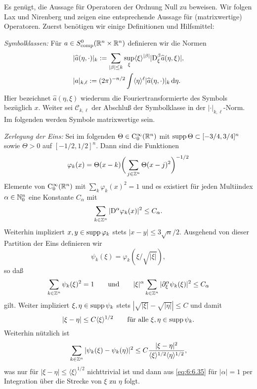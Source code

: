 Es genügt, die Aussage für Operatoren der Ordnung Null zu beweisen. Wir folgen Lax und Nirenberg \cite{Lax:1966} und zeigen eine entsprechende Aussage für (matrixwertige) Operatoren. Zuerst benötigen wir einige Definitionen und Hilfsmittel:

\medskip\noindent
{\em Symbolklassen:} Für $ a\in S^0_{\rm comp}(\mathbb R^n\times\mathbb R^n)$ definieren wir die Normen
\begin{equation}
\begin{split}&	\vert \widehat{a}(\eta,\cdot)\vert_k := \sum\limits_{\vert \beta\vert \le k} \sup\limits_{\xi} \langle \xi\rangle^{\vert \beta\vert}\vert\mathrm D_\xi^\beta  \widehat{a}(\eta,\xi)\vert,\\
&   | a|_{k,\ell} := (2\pi)^{-n/2} \int \langle\eta\rangle^\ell   \vert \widehat{a}(\eta,\cdot)\vert_k \,\mathrm d \eta.
\end{split}
\end{equation}
Hier bezeichnet $\widehat a(\eta,\xi)$ wiederum die Fouriertransformierte des Symbols bezüglich $x$. Weiter sei $\mathcal{C}_{k,\ell}$ der Abschluß der Symbolklasse in der $ |\cdot |_{k,\ell}$-Norm.
Im folgenden werden Symbole matrixwertige sein.

\medskip\noindent
{\em Zerlegung der Eins:} Sei im folgenden $\Theta\in\mathrm C_0^\infty(\mathbb R^n)$ mit $\operatorname{supp}\Theta\subset [-3/4,3/4]^n$ sowie $\Theta>0$ auf $[-1/2,1/2]^n$. Dann sind die Funktionen
\begin{equation}
\varphi_k(x) = \Theta(x-k) \bigg(\sum_{j\in\mathbb Z^n} \Theta(x-j)^2\bigg)^{-1/2}
\end{equation}
Elemente von $\mathrm C_0^\infty(\mathbb R^n)$ mit $\sum_{k} \varphi_k(x)^2=1$ und es existiert für jeden Multiindex $\alpha\in\mathbb N_0^n$ eine Konstante $C_\alpha$ mit
\begin{equation}
    \sum_{k\in\mathbb Z^n} | \mathrm D^\alpha \varphi_k(x)|^2 \le C_\alpha.
\end{equation}
Weiterhin impliziert $x,y\in\operatorname{supp}\varphi_k$ stets $|x-y|\le 3\sqrt n/2$. Ausgehend von dieser Partition der Eins definieren wir
\begin{equation}
    \psi_k(\xi)= \varphi_k(\xi / \sqrt{|\xi|}), 
\end{equation}
so daß
\begin{equation}\label{eq:6:6.35} 
    \sum_{k\in\mathbb Z^n} \psi_k(\xi)^2 = 1\qquad\text{und}\qquad |\xi|^\alpha \sum_{k\in\mathbb Z^n} |\partial_\xi^\alpha \psi_k(\xi)|^2 \le C_\alpha
\end{equation}
gilt. Weiter impliziert $\xi,\eta\in\operatorname{supp}\psi_k$ stets $|\sqrt{|\xi|}-\sqrt{|\eta|}|\le C$ und damit 
\begin{equation}\label{eq:6:6.36}
 |\xi-\eta|\le C \langle\xi\rangle^{1/2} \qquad\text{für alle $\xi,\eta\in\operatorname{supp}\psi_k$}.
\end{equation}
Weiterhin nützlich ist
\begin{equation}\label{eq:6:6.37}
  \sum_{k\in\mathbb Z^n} |\psi_k(\xi)-\psi_k(\eta)|^2 \le C \frac{|\xi-\eta|^2}{ \langle\xi\rangle^{1/2} \langle\eta\rangle^{1/2}},
\end{equation} 
was nur für $|\xi-\eta|\le \langle\xi\rangle^{1/2}$ nichttrivial ist und dann aus \eqref{eq:6:6.35} für $|\alpha|=1$ per Integration über die Strecke von $\xi$ zu $\eta$ folgt.

